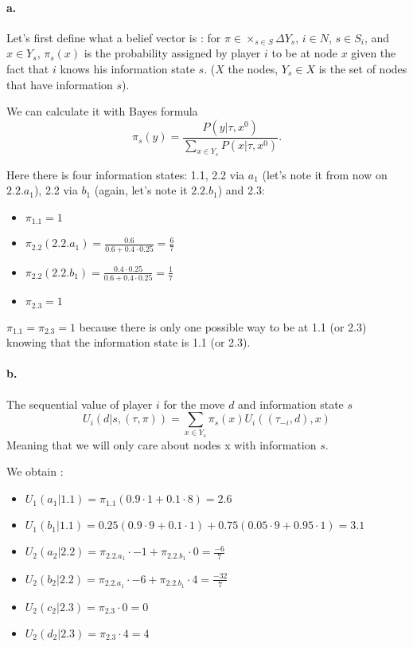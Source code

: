 \paragraph{a.} Let's first define what a belief vector is : for $\pi \in  \times_{s \in S} \Delta Y_s $, $i \in N$, $s \in S_i$, and $x \in Y_s$, $\pi_s(x)$ is the probability assigned by player $i$ to be at node $x$ given the fact that $i$ knows his information state $s$. ($X$ the nodes, $Y_s\in X$ is the set of nodes that have information $s$). 

We can calculate it with Bayes formula $$ \pi_s(y) = \frac{P(y | \tau, x^0)}{\sum_{x \in Y_s} P(x | \tau, x^0)}. $$

Here there is four information states: 1.1, 2.2 via $a_1$ (let's note it from now on $2.2.a_1$), 2.2 via $b_1$ (again, let's note it $2.2.b_1$) and 2.3: 

\begin{itemize}
\item $\pi_{1.1}= 1$ 
\item $\pi_{2.2}(2.2.a_1) = \frac{0.6}{0.6+0.4 \cdot 0.25} = \frac{6}{7}$
\item $\pi_{2.2}(2.2.b_1)= \frac{0.4\cdot 0.25}{0.6+0.4 \cdot 0.25} = \frac{1}{7}$ 
\item $\pi_{2.3}     = 1 $
\end{itemize}
$\pi_{1.1}=\pi_{2.3} = 1$ because there is only one possible way to be at 1.1 (or 2.3) knowing that the information state is 1.1 (or 2.3).

\paragraph{b.} The sequential value of player $i$ for the move $d$ and information state $s$ $$ U_i(d| s, (\tau, \pi) ) = \sum_{x \in Y_s} \pi_s(x) U_i((\tau_{-i}, d), x)$$
Meaning that we will only care about nodes x with information $s$. 

We obtain : 
\begin{itemize}
\item $U_1(a_1|1.1) = \pi_{1.1} (0.9 \cdot 1 + 0.1 \cdot 8) = 2.6$
\item $U_1(b_1|1.1) = 0.25 (0.9 \cdot 9 + 0.1 \cdot 1) + 0.75 (0.05 \cdot 9 + 0.95 \cdot 1) = 3.1$
\item $U_2(a_2|2.2) = \pi_{2.2.a_1} \cdot -1 + \pi_{2.2.b_1} \cdot 0 = \frac{-6}{7}$
\item $U_2(b_2|2.2) = \pi_{2.2.a_1} \cdot -6 + \pi_{2.2.b_1} \cdot 4 = \frac{-32}{7}$
\item $U_2(c_2|2.3) = \pi_{2.3} \cdot 0 = 0 $
\item $U_2(d_2|2.3) = \pi_{2.3} \cdot 4 = 4$
\end{itemize}

